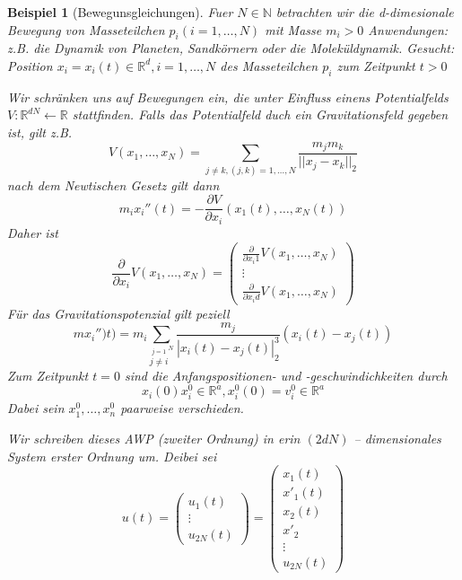 \documentclass[11pt]{book}
\newcommand{\RR}{\mathbb{R}}
\newcommand{\NN}{\mathbb{N}}
\theoremstyle{break}
\theoremstyle{myStyle}
\newcounter{myCounter}[chapter]
\newtheorem{Bsp}[myCounter]{Beispiel}
\begin{document}
\begin{Bsp}[Bewegunsgleichungen]
  Fuer \( N \in \NN \) betrachten wir die d-dimesionale Bewegung von Masseteilchen \( p_i ( i=1,\dotsc,N) \) mit Masse \( m_i > 0 \)
  Anwendungen: z.B. die Dynamik von Planeten, Sandk\"ornern oder die Molek\"uldynamik.
  Gesucht: Position \( x_i = x_i(t) \in \RR^d, i = 1,\dotsc,N \) des Masseteilchen \( p_i \) zum Zeitpunkt \( t > 0 \)

  Wir schr\"anken uns auf Bewegungen ein, die unter Einfluss einens Potentialfelds \( V:\RR^{dN} \leftarrow \RR \) stattfinden. Falls das Potentialfeld duch ein Gravitationsfeld gegeben ist, gilt z.B.
  \[ V(x_1,\dotsc,x_N) = \sum_{j \neq k, (j,k) = 1,\dotsc,N } \frac{m_j m_k}{|| x_j - x_k||_2} \]
  nach dem Newtischen Gesetz gilt dann \[ m_i x_i''(t) = - \frac{\partial V}{\partial x_i} (x_1(t),\dotsc,x_N(t)) \]
  Daher ist
  \[ \frac{\partial}{\partial x_i} V(x_1,\dotsc,x_N) = \begin{pmatrix}
        \frac{\partial}{\partial x_i1} V(x_1, \dots, x_N) \\
        \vdots \\
        \frac{\partial}{\partial x_id} V(x_1, \dots, x_N)
  \end{pmatrix} \] 
  F\"ur das Gravitationspotenzial gilt peziell \[ m x_i'')t) = m_i
    \sum_{\stackrel{j=1}{j \neq i}^N} \frac{m_j}{| x_i(t)-x_j(t)|_2^3}
    (x_i(t)-x_j(t)) \]
  Zum Zeitpunkt \( t= 0 \) sind die Anfangspositionen- und -geschwindichkeiten
  durch \[ x_i(0) x^0_i \in \RR^a, x^0_i(0) = v^0_i \in \RR^a \]
  Dabei sein \( x_1^0,\dotsc,x_n^0 \) paarweise verschieden.

  Wir schreiben dieses AWP (zweiter Ordnung) in erin \( (2dN) \) --
  dimensionales System erster Ordnung um. Deibei sei \[ 
    u(t) = \begin{pmatrix} u_1(t) \\ \vdots  \\ 
      u_{2N}(t) \end{pmatrix} = \begin{pmatrix} x_1(t) \\ x'_1(t) \\ x_2(t) \\ x'_2
      \\\vdots  \\
u_{2N}(t) \end{pmatrix} \]


\end{Bsp}
\end{document}
